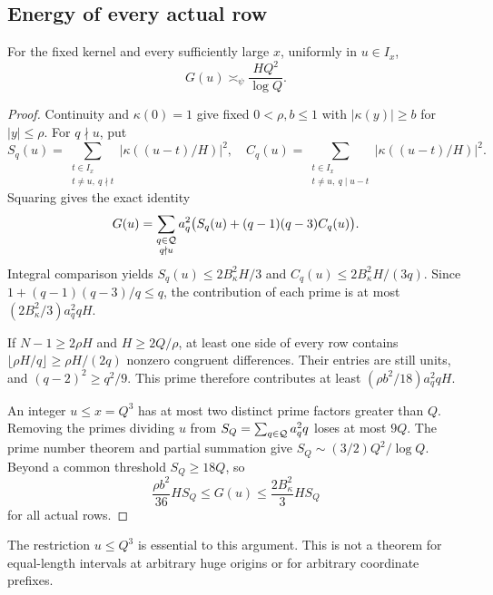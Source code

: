 \subsection{Energy of every actual row}
\begin{proposition}\label{prop:energy}
For the fixed kernel and every sufficiently large $x$, uniformly in $u\in I_x$,
\[
G(u)\asymp_\psi\frac{HQ^2}{\log Q}.
\]
\end{proposition}
\begin{proof}
Continuity and $\kappa(0)=1$ give fixed $0<\rho,b\le1$ with $|\kappa(y)|\ge b$ for $|y|\le\rho$. For $q\nmid u$, put
\[
S_q(u)=\sum_{\substack{t\in I_x\\t\ne u,\ q\nmid t}}|\kappa((u-t)/H)|^2,\quad
C_q(u)=\sum_{\substack{t\in I_x\\t\ne u,\ q\mid u-t}}|\kappa((u-t)/H)|^2.
\]
Squaring gives the exact identity
\[
G(u)=\sum_{\substack{q\in\mathcal Q\\q\nmid u}}a_q^2
\big(S_q(u)+(q-1)(q-3)C_q(u)\big).
\]
Integral comparison yields $S_q(u)\le2B_\kappa^2H/3$ and
$C_q(u)\le2B_\kappa^2H/(3q)$. Since $1+(q-1)(q-3)/q\le q$, the contribution of each prime is at most $(2B_\kappa^2/3)a_q^2qH$.

If $N-1\ge2\rho H$ and $H\ge2Q/\rho$, at least one side of every row contains
$\lfloor\rho H/q\rfloor\ge\rho H/(2q)$ nonzero congruent differences. Their entries are still units, and $(q-2)^2\ge q^2/9$. This prime therefore contributes at least $(\rho b^2/18)a_q^2qH$.

An integer $u\le x=Q^3$ has at most two distinct prime factors greater than $Q$. Removing the primes dividing $u$ from
$S_Q=\sum_{q\in\mathcal Q}a_q^2q$ loses at most $9Q$. The prime number theorem and partial summation give $S_Q\sim(3/2)Q^2/\log Q$. Beyond a common threshold $S_Q\ge18Q$, so
\[
\frac{\rho b^2}{36}HS_Q\le G(u)\le\frac{2B_\kappa^2}{3}HS_Q
\]
for all actual rows.
\end{proof}
The restriction $u\le Q^3$ is essential to this argument. This is not a theorem for equal-length intervals at arbitrary huge origins or for arbitrary coordinate prefixes.

